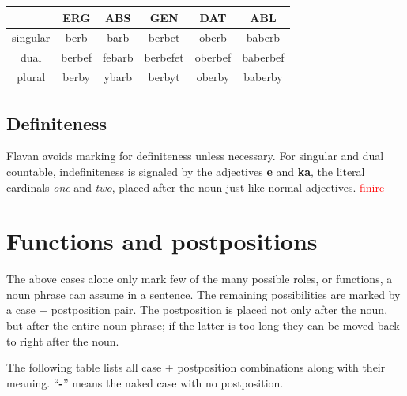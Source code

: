 \documentclass[10pt,oneside]{memoir}
\newcommand{\cmmnt}[1]{\textcolor{red}{#1}}
\begin{document}
\begin{center}
    \begin{tabular}[]{c|| c| c| c| c |c}
            & ERG & ABS & GEN & DAT & ABL \\
            \hline
    singular& berb & barb & berbet & oberb & baberb \\
    dual & berbef & febarb & berbefet & oberbef & baberbef\\
    plural & berby & ybarb & berbyt & oberby & baberby
    \end{tabular}
\end{center}

\subsection{Definiteness}

Flavan avoids marking for definiteness unless necessary. For singular and dual countable, indefiniteness is signaled by the adjectives \textbf{e} and \textbf{ka}, the literal cardinals \emph{one} and \emph{two}, placed after the noun just like normal adjectives. \cmmnt{finire}



\pagebreak

\section{Functions and postpositions} \label{prepositions}

The above cases alone only mark few of the many possible roles, or functions, a noun phrase can assume in a sentence. The remaining possibilities are marked by a case + postposition pair. The postposition is placed not only after the noun, but after the entire noun phrase; if the latter is too long they can be moved back to right after the noun.

The following table lists all case + postposition combinations along with their meaning. ``\textbf{-}'' means the naked case with no postposition.

\newcommand{\xline}{\cline{1-2}\cline{4-4}}
\end{document}
